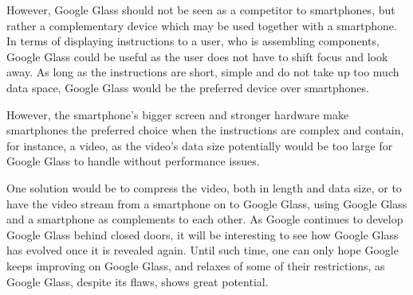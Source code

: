 However, Google Glass should not be seen as a competitor to smartphones, but rather a complementary device which may be used together with a smartphone. In terms of displaying instructions to a user, who is assembling components, Google Glass could be useful as the user does not have to shift focus and look away. As long as the instructions are short, simple and do not take up too much data space, Google Glass would be the preferred device over smartphones.

However, the smartphone's bigger screen and stronger hardware make smartphones the preferred choice when the instructions are complex and contain, for instance, a video, as the video's data size potentially would be too large for Google Glass to handle without performance issues.

One solution would be to compress the video, both in length and data size, or to have the video stream from a smartphone on to Google Glass, using Google Glass and a smartphone as complements to each other. As Google continues to develop Google Glass behind closed doors, it will be interesting to see how Google Glass has evolved once it is revealed again. Until such time, one can only hope Google keeps improving on Google Glass, and relaxes of some of their restrictions, as Google Glass, despite its flaws, shows great potential.